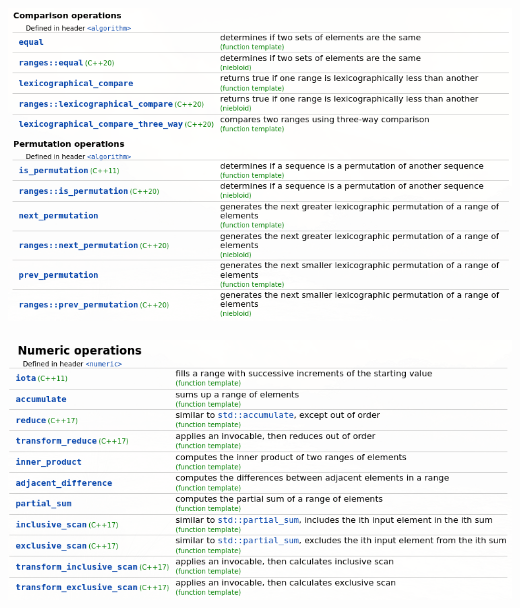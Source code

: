 \documentclass[11pt,twoside,twocolumn,landscape]{article}
\begin{document}
\begin{center}
\includegraphics[width=.9\linewidth]{img/algorithm_7.png}
\end{center}
\begin{center}
\includegraphics[width=.9\linewidth]{img/nummeric.png}
\end{center}
\end{document}
